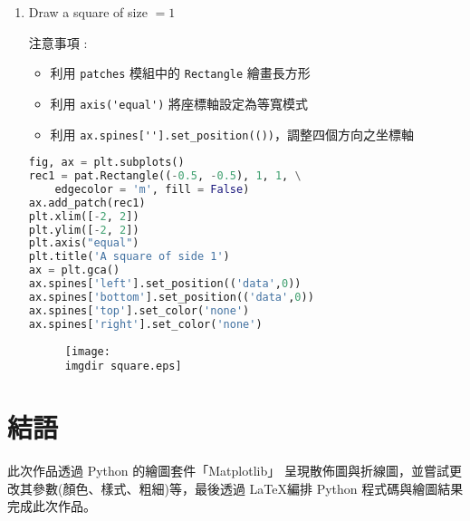 \begin{enumerate}
注意事項 :
\begin{itemize}
\item 
將座標轉為極座標，$x = rcos(\theta)$ and $y = rsin(\theta), \,\, 0 \leq \theta \leq 2\pi$	 
\item
利用 \verb|axis('equal')| 將座標軸設定為等寬模式
\item
利用 \verb|ax.spines[''].set_position(())|，調整四個方向之坐標軸
\end{itemize}
\bigskip
\begin{lstlisting}[language = Python]
theta = np.linspace(0, 2*np.pi, 200) # 弧度
r = 1 # 半徑
x = r*np.cos(theta)
y = r*np.sin(theta)
plt.plot(x, y, color = 'g')
plt.ylim([-2, 2])
plt.title(r'$\mathrm{Parametric \,\,Equation \
	\,\,Circle}: \,\, x^2+y^2 = 1$')
plt.axis('equal')
ax = plt.gca()
ax.spines['left'].set_position(('data',0)) 
ax.spines['bottom'].set_position(('data',0)) 
ax.spines['top'].set_color('none')
ax.spines['right'].set_color('none')
\end{lstlisting}
\begin{figure}[H]
    \centering
        \texttt{[image: \\imgdir circle.eps]}
\end{figure}
\item 
Draw a square of size $= 1$

注意事項 :
\begin{itemize}
\item 
利用 \verb|patches| 模組中的 \verb|Rectangle| 繪畫長方形
\item
利用 \verb|axis('equal')| 將座標軸設定為等寬模式
\item
利用 \verb|ax.spines[''].set_position(())|，調整四個方向之坐標軸
\end{itemize}
\bigskip
\begin{lstlisting}[language = Python]
fig, ax = plt.subplots()
rec1 = pat.Rectangle((-0.5, -0.5), 1, 1, \
	edgecolor = 'm', fill = False)
ax.add_patch(rec1)
plt.xlim([-2, 2])
plt.ylim([-2, 2])
plt.axis("equal")
plt.title('A square of side 1')
ax = plt.gca()
ax.spines['left'].set_position(('data',0)) 
ax.spines['bottom'].set_position(('data',0)) 
ax.spines['top'].set_color('none')
ax.spines['right'].set_color('none')
\end{lstlisting}
\begin{figure}[H]
    \centering
        \texttt{[image: \\imgdir square.eps]}
\end{figure}
\end{enumerate}

\section{結語}
此次作品透過  Python 的繪圖套件「Matplotlib」 呈現散佈圖與折線圖，並嘗試更改其參數(顏色、樣式、粗細)等，最後透過 \LaTeX 編排 Python 程式碼與繪圖結果完成此次作品。

%